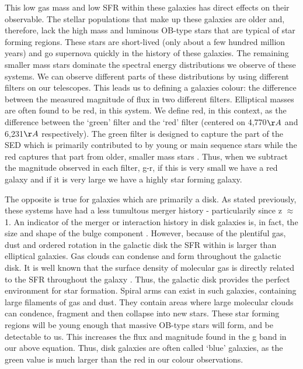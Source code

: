 This low gas mass and low SFR within these galaxies has direct effects on their observable. The stellar populations that make up these galaxies are older and, therefore, lack the high mass and luminous OB-type stars that are typical of star forming regions. These stars are short-lived (only about a few hundred million years) and go supernova quickly in the history of these galaxies. The remaining smaller mass stars dominate the spectral energy distributions we observe of these systems. We can observe different parts of these distributions by using different filters on our telescopes. This leads us to defining a galaxies colour: the difference between the measured magnitude of flux in two different filters. Elliptical masses are often found to be red, in this system. We define red, in this context, as the difference between the `green' filter and the `red' filter (centered on 4,770$\AA$ and 6,231$\AA$ respectively). The green filter is designed to capture the part of the SED which is primarily contributed to by young or main sequence stars while the red captures that part from older, smaller mass stars \citep{Part of the SED we observe in each filter?}. Thus, when we subtract the magnitude observed in each filter, g-r, if this is very small we have a red galaxy and if it is very large we have a highly star forming galaxy. 

The opposite is true for galaxies which are primarily a disk. As stated previously, these systems have had a less tumultous merger history - particularily since z $\approx$ 1. An indicator of the merger or interaction history in disk galaxies is, in fact, the size and shape of the bulge component \citep{Bulge component is an indicator of merger history}. However, because of the plentiful gas, dust and ordered rotation in the galactic disk the SFR within is larger than elliptical galaxies. Gas clouds can condense and form throughout the galactic disk. It is well known that the surface density of molecular gas is directly related to the SFR throughout the galaxy \citep{Citing kennicutt, Schmidt etc}. Thus, the galactic disk provides the perfect environment for star formation. Spiral arms can exist in such galaxies, containing large filaments of gas and dust. They contain areas where large molecular clouds can condence, fragment and then collapse into new stars. These star forming regions will be young enough that massive OB-type stars will form, and be detectable to us. This increases the flux and magnitude found in the g band in our above equation. Thus, disk galaxies are often called `blue' galaxies, as the green value is much larger than the red in our colour observations.

